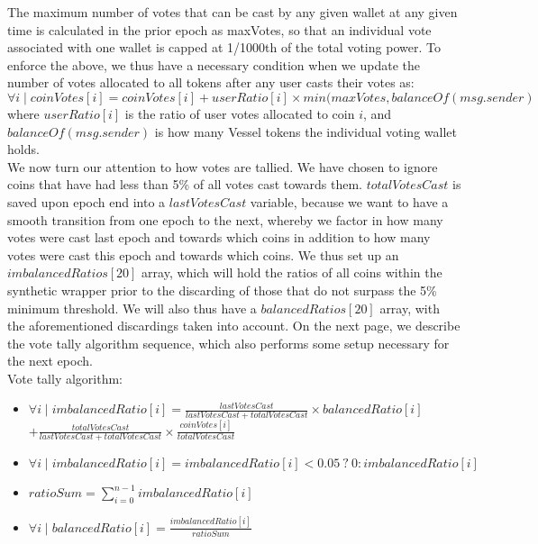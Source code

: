 \documentclass[letterpaper,11pt]{article}
\begin{document}
The maximum number of votes that can be cast by any given wallet at any given time is calculated in the prior epoch as maxVotes, so that an individual vote associated with one wallet is capped at 1/1000th of the total voting power. To enforce the above, we thus have a necessary condition when we update the number of votes allocated to all tokens after any user casts their votes as:\\

$\forall i \mid coinVotes[i]=coinVotes[i]+userRatio[i]\times min(maxVotes, balanceOf(msg.sender)$\\

\noindent where $userRatio[i]$ is the ratio of user votes allocated to coin $i$, and $balanceOf(msg.sender)$ is how many Vessel tokens the individual voting wallet holds. \\

We now turn our attention to how votes are tallied. We have chosen to ignore coins that have had less than 5\% of all votes cast towards them. $totalVotesCast$ is saved upon epoch end into a $lastVotesCast$ variable, because we want to have a smooth transition from one epoch to the next, whereby we factor in how many votes were cast last epoch and towards which coins in addition to how many votes were cast this epoch and towards which coins. We thus set up an $imbalancedRatios[20]$ array, which will hold the ratios of all coins within the synthetic wrapper prior to the discarding of those that do not surpass the 5\% minimum threshold. We will also thus have a $balancedRatios[20]$ array, with the aforementioned discardings taken into account. On the next page, we describe the vote tally algorithm sequence, which also performs some setup necessary for the next epoch. \\



\noindent Vote tally algorithm:

\begin{itemize}
\item $\forall i\mid imbalancedRatio[i]=\frac{lastVotesCast}{lastVotesCast+totalVotesCast}\times balancedRatio[i]$\\ \vspace{0.15cm}
\hspace{4cm}$+\frac{totalVotesCast}{lastVotesCast+totalVotesCast}\times \frac{coinVotes[i]}{totalVotesCast}$

\item $\forall i \mid imbalancedRatio[i]=imbalancedRatio[i] < 0.05\:?\:0: imbalancedRatio[i]$

\item $ratioSum = \sum_{i=0}^{n-1}imbalancedRatio[i]$

\item $\forall i \mid balancedRatio[i]=\frac{imbalancedRatio[i]}{ratioSum}$

\end{itemize}
\end{document}
